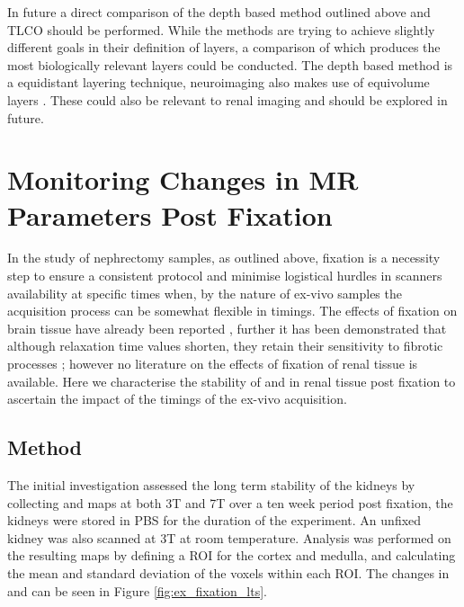 In future a direct comparison of the depth based method outlined above and \ac{TLCO} should be performed. While the methods are trying to achieve slightly different goals in their definition of layers, a comparison of which produces the most biologically relevant layers could be conducted. The depth based method is a equidistant layering technique, neuroimaging also makes use of equivolume layers \cite{waehnert_anatomically_2014}. These could also be relevant to renal imaging and should be explored in future.

\section{Monitoring Changes in MR Parameters Post Fixation}
\label{sec:ex_tissue_fixation}
In the study of nephrectomy samples, as outlined above, fixation is a necessity step to ensure a consistent protocol and minimise logistical hurdles in scanners availability at specific times when, by the nature of ex-vivo samples the acquisition process can be somewhat flexible in timings. The effects of fixation on brain tissue have already been reported \cite{birkl_effects_2016, schmierer_quantitative_2008, shatil_quantitative_2018}, further it has been demonstrated that although relaxation time values shorten, they retain their sensitivity to fibrotic processes \cite{jafari_integrated_2021}; however no literature on the effects of fixation of renal tissue is available. Here we characterise the stability of \tone and \ttwostar in renal tissue post fixation to ascertain the impact of the timings of the ex-vivo acquisition.

\subsection{Method}
The initial investigation assessed the long term stability of the kidneys by collecting \tone and \ttwostar maps at both 3T and 7T over a ten week period post fixation, the kidneys were stored in \ac{PBS} for the duration of the experiment. An unfixed kidney was also scanned at 3T at room temperature. Analysis was performed on the resulting maps by defining a \ac{ROI} for the cortex and medulla, and calculating the mean and standard deviation of the voxels within each \ac{ROI}. The changes in \tone and \ttwostar can be seen in Figure \ref{fig:ex_fixation_lts}. 

